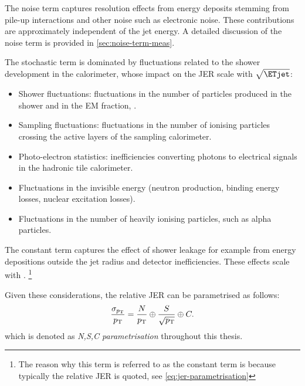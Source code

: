 The noise term captures resolution effects from energy deposits stemming from pile-up interactions and other noise such as electronic noise. These contributions are approximately independent of the jet energy. A detailed discussion of the noise term is provided in \cref{sec:noise-term-meas}.

The stochastic term is dominated by fluctuations related to the shower development in the calorimeter, whose impact on the JER scale with $\sqrt{\ETjet}$:
\begin{itemize}
    \item Shower fluctuations: fluctuations in the number of particles produced in the shower and in the EM fraction, \fEM.
    \item Sampling fluctuations: fluctuations in the number of ionising particles crossing the active layers of the sampling calorimeter.
    \item Photo-electron statistics: inefficiencies converting photons to electrical signals in the hadronic tile calorimeter.
    \item Fluctuations in the invisible energy (neutron production, binding energy losses, nuclear excitation losses).
    \item Fluctuations in the number of heavily ionising particles, such as alpha particles.
\end{itemize}
The constant term captures the effect of shower leakage for example from energy depositions outside the jet radius and detector inefficiencies. These effects scale with \ETjet. \footnote{The reason why this term is referred to as the constant term is because typically the relative JER is quoted, see \cref{eq:jer-parametrisation}}

Given these considerations, the relative JER can be parametrised as follows:
\begin{equation}
    \label{eq:jer-parametrisation}
    \frac{\sigma_{p_{\rm T}}}{p_{\rm T}} = \frac{N}{p_{\rm T}} \oplus \frac{S}{\sqrt{p_{\rm T}}} \oplus C.
\end{equation}
which is denoted as \emph{N,S,C parametrisation} throughout this thesis.


